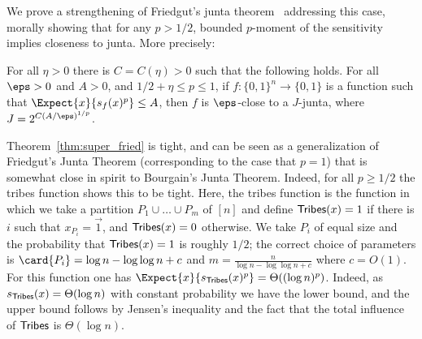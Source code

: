 We prove a strengthening of Friedgut's junta theorem~\cite{Friedgut} addressing this case, morally showing that for any $p>1/2$, bounded $p$-moment of
the sensitivity implies closeness to junta. More precisely:
\begin{thm}\label{thm:super_fried}
  For all $\eta>0$ there is $C = C(\eta)>0$ such that  the following holds.
  For all $\eps>0$ and $A>0$, and $1/2 + \eta\leq p\leq 1$, if $f\colon\{0,1\}^n\to\{0,1\}$ is a function such that
  $\Expect{x}{s_f(x)^{p}}\leq A$, then $f$ is $\eps$-close to a $J$-junta, where $J = 2^{C\left(A/\eps\right)^{1/p}}$.
\end{thm}
Theorem~\ref{thm:super_fried} is tight, and can be seen as a generalization of Friedgut's Junta Theorem (corresponding to the case that
$p=1$) that is somewhat close in spirit to Bourgain's Junta Theorem. Indeed, for all $p\geq 1/2$ the tribes function shows
this to be tight. Here, the tribes function is the function in which we take a partition $P_1\cup\ldots\cup P_m$ of $[n]$
and define ${\sf Tribes}(x) = 1$ if there is $i$ such that $x_{P_{i}} = \vec{1}$, and ${\sf Tribes}(x) = 0$ otherwise.
We take $P_i$ of equal size and the probability that ${\sf Tribes}(x)=1$ is roughly $1/2$; the correct choice
of parameters is $\card{P_i} = \log n - \log\log n + c$
and $m =  \frac{n}{\log n - \log\log n + c}$ where $c = O(1)$.
For this function one has $\Expect{x}{s_{{\sf Tribes}}(x)^{p}} = \Theta((\log n)^p)$. Indeed, as $s_{{\sf Tribes}}(x) = \Theta(\log n)$ with
constant probability we have the lower bound, and the upper bound follows by Jensen's inequality and the fact that the total influence of ${\sf Tribes}$
is $\Theta(\log n)$.
